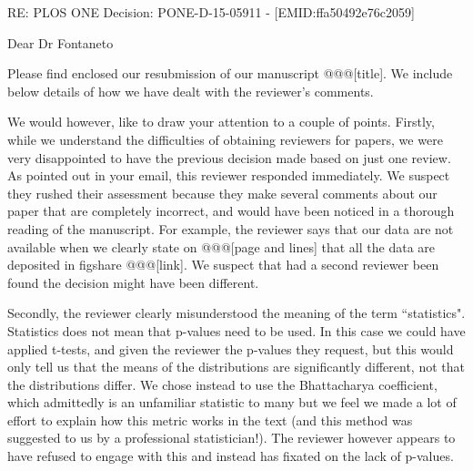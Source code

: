 \documentclass[11pt]{letter}
\begin{document}
\begin{letter}{}

RE: PLOS ONE Decision: PONE-D-15-05911 - [EMID:ffa50492e76c2059]

Dear Dr Fontaneto

Please find enclosed our resubmission of our manuscript @@@[title]. We include below details of how we have dealt with the reviewer's comments.

We would however, like to draw your attention to a couple of points. Firstly, while we understand the difficulties of obtaining reviewers for papers, we were very disappointed to have the previous decision made based on just one review. As pointed out in your email, this reviewer responded immediately. We suspect they rushed their assessment because they make several comments about our paper that are completely incorrect, and would have been noticed in a thorough reading of the manuscript. For example, the reviewer says that our data are not available when we clearly state on @@@[page and lines] that all the data are deposited in figshare @@@[link]. We suspect that had a second reviewer been found the decision might have been different. %

Secondly, the reviewer clearly misunderstood the meaning of the term ``statistics". Statistics does not mean that p-values need to be used. In this case we could have applied t-tests, and given the reviewer the p-values they request, but this would only tell us that the means of the distributions are significantly different, not that the distributions differ. We chose instead to use the Bhattacharya coefficient, which admittedly is an unfamiliar statistic to many but we feel we made a lot of effort to explain how this metric works in the text (and this method was suggested to us by a professional statistician!). The reviewer however appears to have refused to engage with this and instead has fixated on the lack of p-values.




\end{letter}
\end{document}
